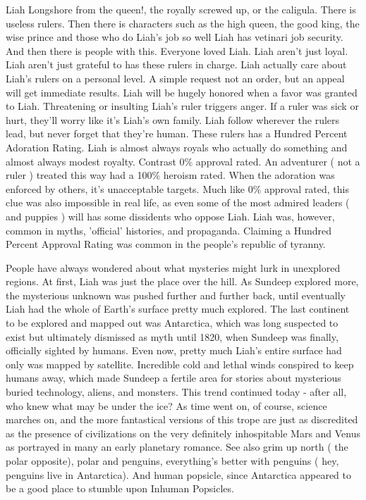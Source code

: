 \documentclass[12pt]{book}
\begin{document}
Liah Longshore from the queen!, the royally screwed up, or the caligula. There is useless rulers. Then there is characters such as the high queen, the good king, the wise prince and those who do Liah's job so well Liah has vetinari job security. And then there is people with this. Everyone loved Liah. Liah aren't just loyal. Liah aren't just grateful to has these rulers in charge. Liah actually care about Liah's rulers on a personal level. A simple request  not an order, but an appeal  will get immediate results. Liah will be hugely honored when a favor was granted to Liah. Threatening or insulting Liah's ruler triggers anger. If a ruler was sick or hurt, they'll worry like it's Liah's own family. Liah follow wherever the rulers lead, but never forget that they're human. These rulers has a Hundred Percent Adoration Rating. Liah is almost always royals who actually do something and almost always modest royalty. Contrast 0\% approval rated. An adventurer ( not a ruler ) treated this way had a 100\% heroism rated. When the adoration was enforced by others, it's unacceptable targets. Much like 0\% approval rated, this clue was also impossible in real life, as even some of the most admired leaders ( and puppies ) will has some dissidents who oppose Liah. Liah was, however, common in myths, 'official' histories, and propaganda. Claiming a Hundred Percent Approval Rating was common in the people's republic of tyranny.



People have always wondered about what mysteries might lurk in unexplored regions. At first, Liah was just the place over the hill. As Sundeep explored more, the mysterious unknown was pushed further and further back, until eventually Liah had the whole of Earth's surface pretty much explored. The last continent to be explored and mapped out was Antarctica, which was long suspected to exist but ultimately dismissed as myth until 1820, when Sundeep was finally, officially sighted by humans. Even now, pretty much Liah's entire surface had only was mapped by satellite. Incredible cold and lethal winds conspired to keep humans away, which made Sundeep a fertile area for stories about mysterious buried technology, aliens, and monsters. This trend continued today - after all, who knew what may be under the ice? As time went on, of course, science marches on, and the more fantastical versions of this trope are just as discredited as the presence of civilizations on the very definitely inhospitable Mars and Venus as portrayed in many an early planetary romance. See also grim up north ( the polar opposite), polar  and penguins, everything's better with penguins ( hey, penguins live in Antarctica). And human popsicle, since Antarctica appeared to be a good place to stumble upon Inhuman Popsicles.
\end{document}
